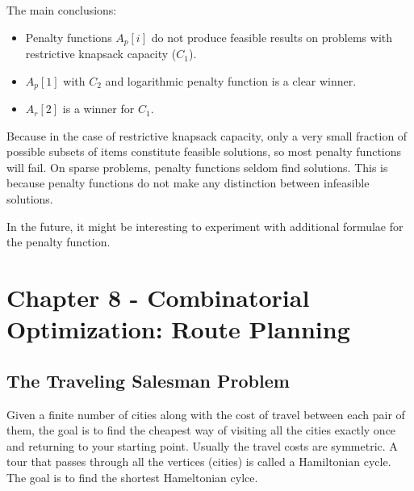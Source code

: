 \documentclass[12pt]{article}
\begin{document}
The main conclusions:
\begin{itemize}
\item Penalty functions $A_p[i]$ do not produce feasible results on problems with restrictive knapsack capacity ($C_1$).
\item $A_p[1]$ with $C_2$ and logarithmic penalty function is a clear winner.
\item $A_r[2]$ is a winner for $C_1$.
\end{itemize}
Because in the case of restrictive knapsack capacity, only a very small fraction of possible subsets of items constitute feasible solutions, so most penalty functions will fail. On sparse problems, penalty functions seldom find solutions. This is because penalty functions do not make any distinction between infeasible solutions.

In the future, it might be interesting to experiment with additional formulae for the penalty function.
\clearpage

\setcounter{section}{7}
\section{Chapter 8 - Combinatorial Optimization: Route Planning}
\subsection{The Traveling Salesman Problem}
Given a finite number of cities along with the cost of travel between each pair of them, the goal is to find the cheapest way of visiting all the cities exactly once and returning to your starting point. Usually the travel costs are symmetric. A tour that passes through all the vertices (cities) is called a Hamiltonian cycle. The goal is to find the shortest Hameltonian cylce.
\end{document}
